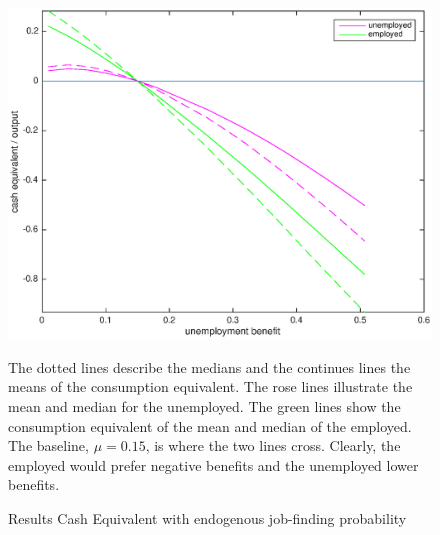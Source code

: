 \documentclass[a4paper,12pt]{article}
\begin{document}
\begin{figure}
\caption{Results Cash Equivalent with endogenous job-finding probability} 
\label{baseline_ue_vs_e}	%
\centering
\includegraphics[scale=.5]{cash_equivalent(ue_vs_e)}  %

\begin{minipage}{0.8\linewidth}
\footnotesize{The dotted lines describe the medians and the continues lines the means of the consumption equivalent. The rose lines illustrate the mean and median for the unemployed. The green lines show the consumption equivalent of the mean and median of the employed. The baseline, $\mu = 0.15$, is where the two lines cross. Clearly, the employed would prefer negative benefits and the unemployed lower benefits. }
\end{minipage}

\end{figure}
\end{document}
